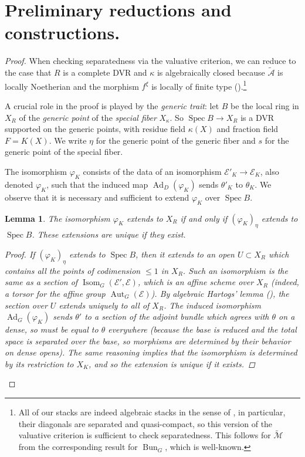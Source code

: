 \documentclass[openany]{amsbook}
\newtheorem{lemma}[theorem]{Lemma}
\theoremstyle{definition}
\theoremstyle{remark}
\numberwithin{equation}{section}
\newcommand{\cA}{\mathcal{A}}
\newcommand{\cM}{\mathcal{M}}
\newcommand{\cE}{\mathcal{E}}
\renewcommand{\phi}{\varphi}
\renewcommand{\-}{\operatorname{-}}
\newcommand{\Spec}{\operatorname{Spec}}
\newcommand{\on}[1]{\operatorname{#1}}
\newcommand{\ctM}{\widetilde{\cM}}
\newcommand{\ctA}{\widetilde{\cA}}
\begin{document}
\section{Preliminary reductions and constructions.}\label{subsect.sep.prelim.reduction}
\begin{proof}
When checking separatedness via the valuative criterion, we can reduce to the case that $R$ is a complete DVR and $\kappa$ is algebraically closed because $\ctA$ is locally Noetherian and the morphism $f^\xi$ is locally of finite type (\cite[Prop. 7.8]{lmb}).\footnote{All of our stacks are indeed algebraic stacks in the sense of \cite{lmb}, in particular, their diagonals are separated and quasi-compact, so this version of the valuative criterion is sufficient to check separatedness. This follows for $\ctM$ from the corresponding result for $\on{Bun}_G$, which is well-known.}


A crucial role in the proof is played by the \emph{generic trait}: let $B$ be the local ring in $X_R$ of the \textit{generic point} of the \textit{special fiber} $X_{\kappa}$. So $\Spec B \to X_R$ is a DVR supported on the generic points, with residue field $\kappa(X)$ and fraction field $F = K(X)$. We write $\eta$ for the generic point of the generic fiber and $s$ for the generic point of the special fiber.

The isomorphism $\phi_K$ consists of the data of an isomorphism $\cE'_K \to \cE_K$, also denoted $\phi_K$, such that the induced map $\on{Ad}_D(\phi_K)$ sends $\theta'_K$ to $\theta_K$. We observe that it is necessary and sufficient to extend $\phi_K$ over $\Spec B$.

\begin{lemma}
    The isomorphism $\phi_K$ extends to $X_R$ if and only if $(\phi_K)_{\eta}$ extends to $\Spec B$. These extensions are unique if they exist.
    \begin{proof}
        If $(\phi_K)_{\eta}$ extends to $\Spec B$, then it extends to an open $U \subset X_R$ which contains all the points of codimension $\le 1$ in $X_R$. Such an isomorphism is the same as a section of $\on{Isom}_{G}(\cE', \cE)$, which is an affine scheme over $X_R$ (indeed, a torsor for the affine group $\on{Aut}_G(\cE)$). By algebraic Hartogs' lemma (\cite[IV, Cor. 20.4.12]{EGA}), the section over $U$ extends uniquely to all of $X_R$. The induced isomorphism $\on{Ad}_G(\phi_K)$ sends $\theta'$ to a section of the adjoint bundle which agrees with $\theta$ on a dense, so must be equal to $\theta$ everywhere (because the base is reduced and the total space is separated over the base, so morphisms are determined by their behavior on dense opens). The same reasoning implies that the isomorphism is determined by its restriction to $X_K$, and so the extension is unique if it exists.
    \end{proof}
\end{lemma}


\end{proof}
\end{document}

